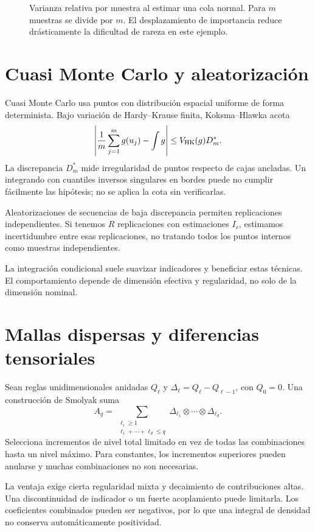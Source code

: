 \documentclass[11pt,a4paper]{article}
\theoremstyle{definition}
\begin{document}
\begin{figure}[htbp]
\caption{Varianza relativa por muestra al estimar una cola normal. Para $m$ muestras se divide por $m$. El desplazamiento de importancia reduce drásticamente la dificultad de rareza en este ejemplo.}\label{fig:cdf-23}\end{figure}

\section{Cuasi Monte Carlo y aleatorización}
Cuasi Monte Carlo usa puntos con distribución espacial uniforme de forma determinista. Bajo variación de Hardy--Krause finita, Koksma--Hlawka acota
\[
\left|\frac1m\sum_{j=1}^mg(u_j)-\int g\right|
\le V_{\rm HK}(g)D_m^*.
\]
La discrepancia $D_m^*$ mide irregularidad de puntos respecto de cajas ancladas. Un integrando con cuantiles inversos singulares en bordes puede no cumplir fácilmente las hipótesis; no se aplica la cota sin verificarlas.

Aleatorizaciones de secuencias de baja discrepancia permiten replicaciones independientes. Si tenemos $R$ replicaciones con estimaciones $I_r$, estimamos incertidumbre entre esas replicaciones, no tratando todos los puntos internos como muestras independientes.

La integración condicional suele suavizar indicadores y beneficiar estas técnicas. El comportamiento depende de dimensión efectiva y regularidad, no solo de la dimensión nominal.

\section{Mallas dispersas y diferencias tensoriales}
Sean reglas unidimensionales anidadas $Q_\ell$ y $\Delta_\ell=Q_\ell-Q_{\ell-1}$, con $Q_0=0$. Una construcción de Smolyak suma
\[
A_q=\sum_{\substack{\ell_i\ge1\\\ell_1+\cdots+\ell_d\le q}}
\Delta_{\ell_1}\otimes\cdots\otimes\Delta_{\ell_d}.
\]
Selecciona incrementos de nivel total limitado en vez de todas las combinaciones hasta un nivel máximo. Para constantes, los incrementos superiores pueden anularse y muchas combinaciones no son necesarias.

La ventaja exige cierta regularidad mixta y decaimiento de contribuciones altas. Una discontinuidad de indicador o un fuerte acoplamiento puede limitarla. Los coeficientes combinados pueden ser negativos, por lo que una integral de densidad no conserva automáticamente positividad.
\end{document}
